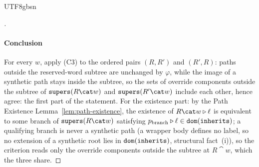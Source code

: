 \begin{CJK*}{UTF8}{gbsn}
\begin{proof}[]
  \paragraph{Conclusion}
  For every $w$, apply (C3) to the ordered pairs $(R, R')$ and
  $(R', R)$: paths outside the reserved-word subtree are unchanged
  by $\varphi$, while the image of a synthetic path stays inside
  the subtree, so the sets of override components outside the
  subtree of $\supers(R \cat w)$ and $\supers(R' \cat w)$ include
  each other, hence agree: the first part of the statement. For the
  existence part: by the Path Existence
  Lemma~\ref{lem:path-existence}, the existence of
  $R \cat w \snoc \ell$ is equivalent to some branch of
  $\supers(R \cat w)$ satisfying
  $p_{\mathrm{branch}} \mathbin{\triangleright} \ell \in \mathtt{dom}(\mathtt{inherits})$; a
  qualifying branch is never a synthetic path (a wrapper body
  defines no label, so no extension of a synthetic root lies in
  $\mathtt{dom}(\mathtt{inherits})$, structural fact~(i)), so the criterion reads
  only the override components outside the subtree at $R \cat w$,
  which the three share.
\fi
\end{proof}


\end{CJK*}
